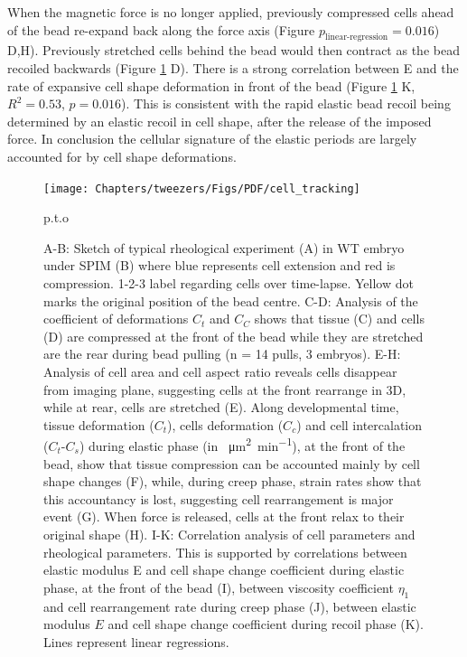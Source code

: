 When the magnetic force is no longer applied, previously compressed cells ahead of the bead re-expand back along the force axis (Figure $p_\text{linear-regression} = 0.016$) D,H).
Previously stretched cells behind the bead would then contract as the bead recoiled backwards (Figure \ref{fig:cell_tracking} D).
There is a strong correlation between E and the rate of expansive cell shape deformation in front of the bead (Figure \ref{fig:cell_tracking} K, $R^2 = 0.53$, $p = 0.016$).
This is consistent with the rapid elastic bead recoil being determined by an elastic recoil in cell shape, after the release of the imposed force.
In conclusion the cellular signature of the elastic periods are largely accounted for by cell shape deformations.

\begin{landscape}
  \begin{figure}
    \centering
     \texttt{[image: Chapters/tweezers/Figs/PDF/cell\_tracking]}
     \caption{p.t.o}
      \label{fig:cell_tracking}
  \end{figure}
\end{landscape}
\begin{figure}\ContinuedFloat
  \caption{
  A-B: Sketch of typical rheological experiment (A) in WT embryo under SPIM (B) where blue represents cell extension and red is compression. 1-2-3 label regarding cells over time-lapse.
  Yellow dot marks the original position of the bead centre.
  C-D: Analysis of the coefficient of deformations $C_t$ and $C_C$ shows that tissue (C) and cells (D) are compressed at the front of the bead while they are stretched are the rear during bead pulling (n = 14 pulls, 3 embryos).
  E-H: Analysis of cell area and cell aspect ratio reveals cells disappear from imaging plane, suggesting cells at the front rearrange in 3D, while at rear, cells are stretched (E).
  Along developmental time, tissue deformation ($C_t$), cells deformation ($C_c$) and cell intercalation ($C_t$-$C_s$) during elastic phase (in \SI{}{\micro\metre\squared\per\minute}), at the front of the bead, show that tissue compression can be accounted mainly by cell shape changes (F), while, during creep phase, strain rates show that this accountancy is lost, suggesting cell rearrangement is major event (G).
  When force is released, cells at the front relax to their original shape (H).
  I-K: Correlation analysis of cell parameters and rheological parameters.
  This is supported by correlations between elastic modulus E and cell shape change coefficient during elastic phase, at the front of the bead (I), between viscosity coefficient $\eta_1$ and cell rearrangement rate during creep phase (J), between elastic modulus $E$ and cell shape change coefficient during recoil phase (K).
  Lines represent linear regressions.
  }
\end{figure}
